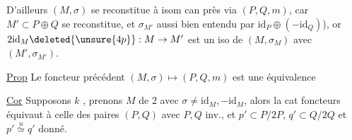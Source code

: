 D'ailleurs  $(M,\sigma)$ se reconstitue à isom can près via $(P,Q,m)$, car $M'\subset P\oplus Q$ se reconstitue, et $\sigma_{M'}$ aussi bien entendu par $\mathrm{id}_P\oplus(-\mathrm{id}_Q)$), or $2\mathrm{id}_M\deleted{\unsure{4p}}:M\to M'$ est un iso de $(M,\sigma_M)$ avec $(M',\sigma_{M'})$.

\uline{Prop} Le foncteur précédent $(M,\sigma)\longmapsto(P,Q,m)$ est une équivalence

\uline{Cor} Supposons $k$   , prenons  $M$   de  2 avec $\sigma\ne\mathrm{id}_M,-\mathrm{id}_M$, alors la cat  foncteurs  équivaut à celle des paires $(P,Q)$ avec $P,Q$ inv., et $p'\subset P/2P$, $q'\subset Q/2Q$ et $p'\overset u\simeq q'$ donné.
